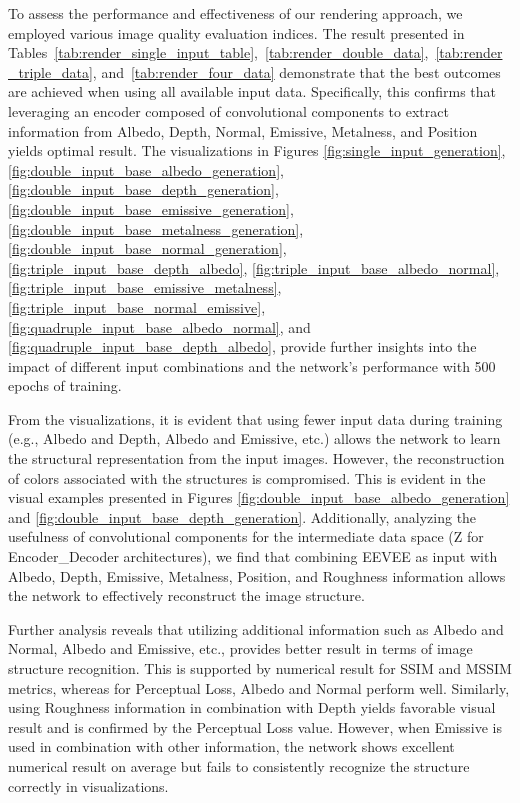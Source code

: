 To assess the performance and effectiveness of our rendering approach, we employed various image quality evaluation indices. The result presented in Tables~\ref{tab:render_single_input_table},~\ref{tab:render_double_data},~\ref{tab:render_triple_data}, and~\ref{tab:render_four_data} demonstrate that the best outcomes are achieved when using all available input data. Specifically, this confirms that leveraging an encoder composed of convolutional components to extract information from Albedo, Depth, Normal, Emissive, Metalness, and Position yields optimal result. The visualizations in Figures \ref{fig:single_input_generation}, \ref{fig:double_input_base_albedo_generation}, \ref{fig:double_input_base_depth_generation}, \ref{fig:double_input_base_emissive_generation}, \ref{fig:double_input_base_metalness_generation}, \ref{fig:double_input_base_normal_generation}, \ref{fig:triple_input_base_depth_albedo}, \ref{fig:triple_input_base_albedo_normal}, \ref{fig:triple_input_base_emissive_metalness}, \ref{fig:triple_input_base_normal_emissive}, \ref{fig:quadruple_input_base_albedo_normal}, and \ref{fig:quadruple_input_base_depth_albedo}, provide further insights into the impact of different input combinations and the network's performance with 500 epochs of training.

From the visualizations, it is evident that using fewer input data during training (e.g., Albedo and Depth, Albedo and Emissive, etc.) allows the network to learn the structural representation from the input images. However, the reconstruction of colors associated with the structures is compromised. This is evident in the visual examples presented in Figures \ref{fig:double_input_base_albedo_generation} and \ref{fig:double_input_base_depth_generation}. Additionally, analyzing the usefulness of convolutional components for the intermediate data space (Z for Encoder_Decoder architectures), we find that combining EEVEE as input with Albedo, Depth, Emissive, Metalness, Position, and Roughness information allows the network to effectively reconstruct the image structure.

Further analysis reveals that utilizing additional information such as Albedo and Normal, Albedo and Emissive, etc., provides better result in terms of image structure recognition. This is supported by numerical result for SSIM and MSSIM metrics, whereas for Perceptual Loss, Albedo and Normal perform well. Similarly, using Roughness information in combination with Depth yields favorable visual result and is confirmed by the Perceptual Loss value. However, when Emissive is used in combination with other information, the network shows excellent numerical result on average but fails to consistently recognize the structure correctly in visualizations.

